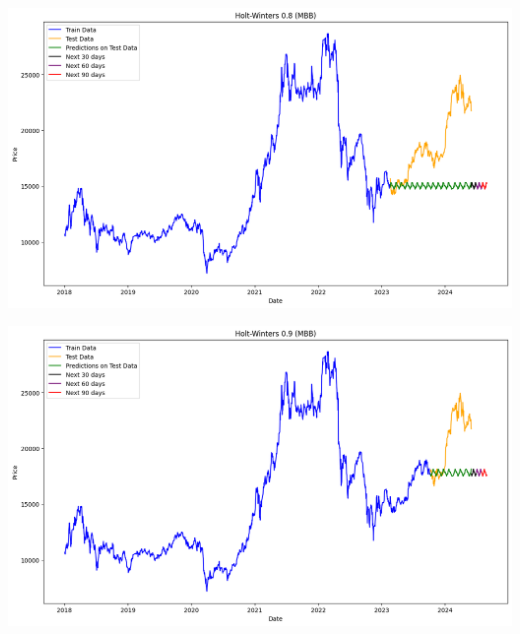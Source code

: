 \documentclass[conference]{IEEEtran}
\begin{document}
\begin{minipage}{0.21\textwidth}
    \centering
    \includegraphics[width=\linewidth]{images/Holt Winter/HW_MBB_82.png}
    \label{fig:image1}
\end{minipage}
\hfill
\begin{minipage}{0.21\textwidth}
    \centering
    \includegraphics[width=\linewidth]{images/Holt Winter/HW_MBB_91.png}
    \label{fig:image2}
\end{minipage}
\end{document}
